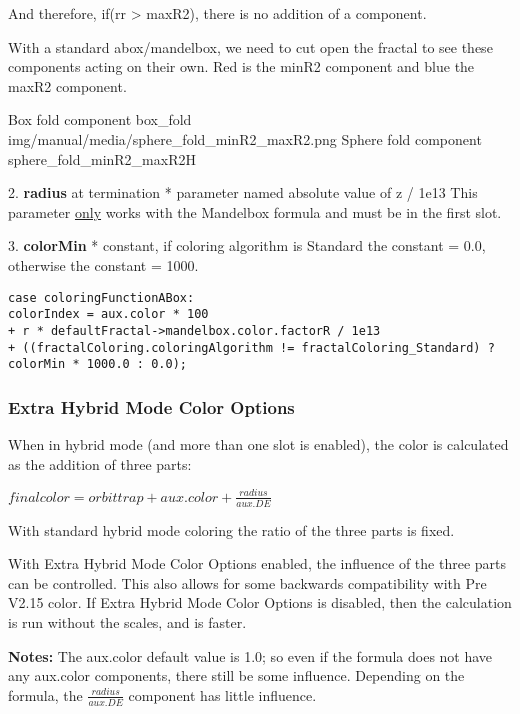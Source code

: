 And therefore,  if(rr > maxR2), there is no addition of a component.

With a standard abox/mandelbox, we need to cut open the fractal to see these components acting on their own. Red is the minR2 component and blue the maxR2 component.

{Box fold component}
{box_fold}
{img/manual/media/sphere_fold_minR2_maxR2.png}
{Sphere fold component}
{sphere_fold_minR2_maxR2}{H}


2. \textbf{radius} at termination * parameter named absolute value of z  / 1e13 
This parameter \underline{only} works with the Mandelbox formula and must be in the first slot.


3. \textbf{colorMin} * constant, if coloring algorithm is Standard the constant = 0.0, otherwise the constant = 1000.

\begin{lstlisting}
case coloringFunctionABox:
colorIndex = aux.color * 100 
+ r * defaultFractal->mandelbox.color.factorR / 1e13 
+ ((fractalColoring.coloringAlgorithm != fractalColoring_Standard) ? colorMin * 1000.0 : 0.0); 
\end{lstlisting}



\subsubsection{Extra Hybrid Mode Color Options}\label{materials-extra-hybrid-mode-color-options}

When in hybrid mode (and more than one slot is enabled), the color is calculated as the addition of three parts:

\(final color = orbit trap  +  aux.color  +  \frac{radius}{aux.DE}\)

With standard hybrid mode coloring the ratio of the three parts is fixed.

With Extra Hybrid Mode Color Options enabled, the influence of the three parts can be controlled. This also allows for some backwards compatibility with Pre V2.15 color. If Extra Hybrid Mode Color Options is disabled, then the calculation is run without the scales, and is faster.

\textbf{Notes: }The aux.color default value is 1.0; so even if the formula does not have any aux.color components, there still be some influence. Depending on the formula, the \(\frac{radius}{aux.DE}\) component has little influence.

